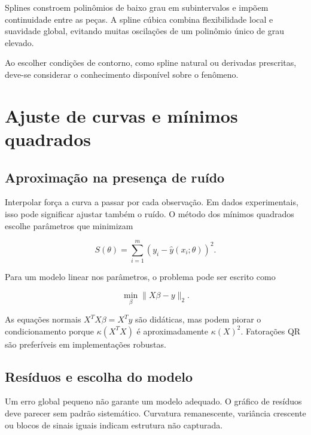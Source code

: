\documentclass[12pt,a4paper,openany]{book}
\begin{document}
Splines constroem polinômios de baixo grau em subintervalos e impõem continuidade entre as peças. A spline cúbica combina flexibilidade local e suavidade global, evitando muitas oscilações de um polinômio único de grau elevado.



Ao escolher condições de contorno, como spline natural ou derivadas prescritas, deve-se considerar o conhecimento disponível sobre o fenômeno.



\chapter{Ajuste de curvas e mínimos quadrados}



\section{Aproximação na presença de ruído}



Interpolar força a curva a passar por cada observação. Em dados experimentais, isso pode significar ajustar também o ruído. O método dos mínimos quadrados escolhe parâmetros que minimizam



\[S(\theta)=\sum_{i=1}^{m}\left(y_i-\widehat{y}(x_i;\theta)\right)^2.\]



Para um modelo linear nos parâmetros, o problema pode ser escrito como



\[\min_\beta \|X\beta-y\|_2.\]



As equações normais $X^T X\beta=X^T y$ são didáticas, mas podem piorar o condicionamento porque $\kappa(X^T X)$ é aproximadamente $\kappa(X)^2$. Fatorações QR são preferíveis em implementações robustas.



\section{Resíduos e escolha do modelo}



Um erro global pequeno não garante um modelo adequado. O gráfico de resíduos deve parecer sem padrão sistemático. Curvatura remanescente, variância crescente ou blocos de sinais iguais indicam estrutura não capturada.
\end{document}
